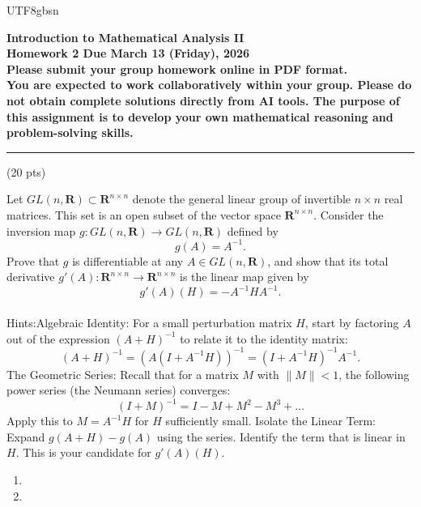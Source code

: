 \documentclass[addpoints]{exam}
\theoremstyle{definition}
\begin{document}
\begin{CJK*}{UTF8}{gbsn}
\begin{center}
    {\Large{\bf Introduction to Mathematical Analysis II\\
    Homework 2  Due  March 13  (Friday), 2026\\
    Please submit your group homework online in PDF format.\\
You are expected to work collaboratively within your group. 
Please do not obtain complete solutions directly from AI tools. 
The purpose of this assignment is to develop your own mathematical reasoning and problem-solving skills. %
  }} \\ 
    \large
\end{center}

\noindent\rule{16.2cm}{0.4pt}


\begin{questions}


\question  (20 pts)  

 Let $GL(n, \mathbf{R}) \subset \mathbf{R}^{n \times n}$ denote the general linear group of invertible $n \times n$ real matrices. This set is an open subset of the vector space $\mathbf{R}^{n \times n}$. Consider the inversion map $g: GL(n, \mathbf{R}) \to GL(n, \mathbf{R})$ defined by$$g(A) = A^{-1}.$$Prove that $g$ is  differentiable at any $A \in GL(n, \mathbf{R})$, and show that its total derivative $g'(A): \mathbf{R}^{n \times n} \to \mathbf{R}^{n \times n}$ is the linear map given by$$g'(A)(H) = -A^{-1} H A^{-1}.$$\\
 Hints:Algebraic Identity: For a small perturbation matrix $H$, start by factoring $A$ out of the expression $(A+H)^{-1}$ to relate it to the identity matrix:$$(A+H)^{-1} = (A(I + A^{-1}H))^{-1} = (I + A^{-1}H)^{-1} A^{-1}.$$ The Geometric Series: Recall that for a matrix $M$ with $\|M\| < 1$, the following power series (the Neumann series) converges:$$(I + M)^{-1} = I - M + M^2 - M^3 + \dots$$Apply this to $M = A^{-1}H$ for $H$ sufficiently small. Isolate the Linear Term: Expand $g(A+H) - g(A)$ using the series. Identify the term that is linear in $H$. This is your candidate for $g'(A)(H)$.

\begin{solution} 
\begin{enumerate}
\item[(a)] 



\bigskip
\item[(b)] 



\end{enumerate}
\end{solution}
\end{questions}
\end{CJK*}
\end{document}
